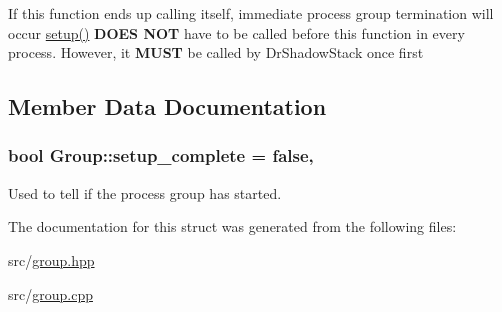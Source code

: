 If this function ends up calling itself, immediate process group termination will occur \hyperlink{struct_group_a9e2d7e0c56696de4592f1b166188c10a}{setup()} {\bfseries D\-O\-E\-S N\-O\-T} have to be called before this function in every process. However, it {\bfseries M\-U\-S\-T} be called by Dr\-Shadow\-Stack once first 

\subsection{Member Data Documentation}
\hypertarget{struct_group_a35632ca452cfe09fbf723539cd264f58}{
\subsubsection[{setup\-\_\-complete}]{\setlength{\rightskip}{0pt plus 5cm}bool Group\-::setup\-\_\-complete = false\hspace{0.3cm}{\ttfamily [static]}, {\ttfamily [private]}}}\label{struct_group_a35632ca452cfe09fbf723539cd264f58}


Used to tell if the process group has started. 



The documentation for this struct was generated from the following files\-:\begin{DoxyCompactItemize}
\item 
src/\hyperlink{group_8hpp}{group.\-hpp}\item 
src/\hyperlink{group_8cpp}{group.\-cpp}\end{DoxyCompactItemize}
